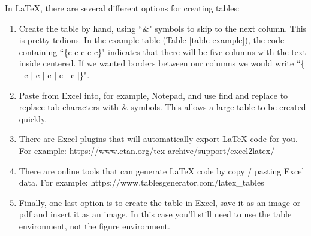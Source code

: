 \documentclass[../main.tex]{subfiles}
\begin{document}
In {\LaTeX}, there are several different options for creating tables:
\begin{enumerate}
\item Create the table by hand, using ``\&" symbols to skip to the next column. This is pretty tedious. In the example table (Table \ref{table example}), the code containing ``\{c c c c c\}" indicates that there will be five columns with the text inside centered. If we wanted borders between our columns we would write ``\{$\vert$ c $\vert$ c $\vert$ c $\vert$ c $\vert$ c $\vert$\}".

\item Paste from Excel into, for example, Notepad, and use find and replace to replace tab characters with \& symbols. This allows a large table to be created quickly.

\item There are Excel plugins that will automatically export {\LaTeX} code for you. For example: https://www.ctan.org/tex-archive/support/excel2latex/

\item There are online tools that can generate {\LaTeX} code by copy / pasting Excel data. For example: https://www.tablesgenerator.com/latex\_tables

\item Finally, one last option is to create the table in Excel, save it as an image or pdf and insert it as an image. In this case you'll still need to use the table environment, not the figure environment.

\end{enumerate}
\end{document}
